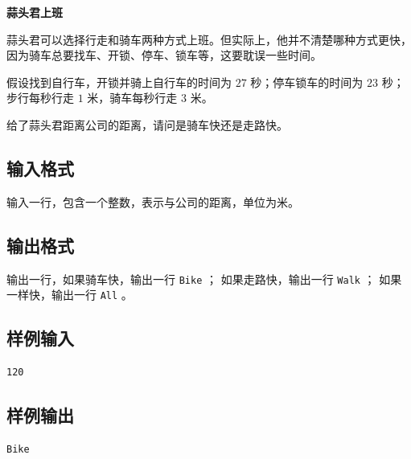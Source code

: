 \documentclass{article}
\newcommand{\problemname}[1]{\begin{center}\Large\bfseries #1\end{center}}
\begin{document}
\problemname{蒜头君上班}

蒜头君可以选择行走和骑车两种方式上班。但实际上，他并不清楚哪种方式更快，因为骑车总要找车、开锁、停车、锁车等，这要耽误一些时间。

假设找到自行车，开锁并骑上自行车的时间为 $27$ 秒；停车锁车的时间为 $23$ 秒；步行每秒行走 $1$ 米，骑车每秒行走 $3$ 米。

给了蒜头君距离公司的距离，请问是骑车快还是走路快。

\subsection*{输入格式}
输入一行，包含一个整数，表示与公司的距离，单位为米。

\subsection*{输出格式}
输出一行，如果骑车快，输出一行 \texttt{Bike} ； 如果走路快，输出一行 \texttt{Walk} ； 如果一样快，输出一行 \texttt{All} 。

\subsection*{样例输入}
\begin{verbatim}
120
\end{verbatim}

\subsection*{样例输出}
\begin{verbatim}
Bike
\end{verbatim}
\end{document}
